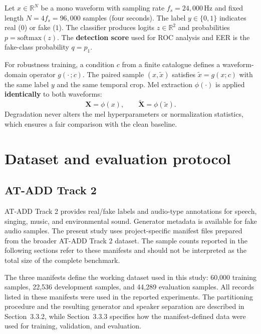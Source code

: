 \documentclass[12pt,a4paper]{report}
\begin{document}
Let $x \in \mathbb{R}^{N}$ be a mono waveform with sampling rate $f_s = 24{,}000$\,Hz and fixed length $N = 4 f_s = 96{,}000$ samples (four seconds). The label $y \in \{0,1\}$ indicates real ($0$) or fake ($1$). The classifier produces logits $z \in \mathbb{R}^2$ and probabilities $p = \mathrm{softmax}(z)$. The \textbf{detection score} used for ROC analysis and EER is the fake-class probability $q = p_1$.

For robustness training, a condition $c$ from a finite catalogue defines a waveform-domain operator $g(\cdot\,; c)$. The paired sample $(x, \tilde{x})$ satisfies $\tilde{x} = g(x; c)$ with the same label $y$ and the same temporal crop. Mel extraction $\phi(\cdot)$ is applied \textbf{identically} to both waveforms:
\begin{equation}
\mathbf{X} = \phi(x), \qquad \tilde{\mathbf{X}} = \phi(\tilde{x}).
\label{eq:pair}
\end{equation}
Degradation never alters the mel hyperparameters or normalization statistics, which ensures a fair comparison with the clean baseline.

\section{Dataset and evaluation protocol}
\label{sec:data}

\subsection{AT-ADD Track 2}
\label{sec:data-track2}

AT-ADD Track 2 provides real/fake labels and audio-type annotations for speech, singing, music, and environmental sound. Generator metadata is available for fake audio samples. The present study uses project-specific manifest files prepared from the broader AT-ADD Track 2 dataset. The sample counts reported in the following sections refer to these manifests and should not be interpreted as the total size of the complete benchmark.

The three manifests define the working dataset used in this study: 60,000 training samples, 22,536 development samples, and 44,289 evaluation samples. All records listed in these manifests were used in the reported experiments. The partitioning procedure and the resulting generator and speaker separation are described in Section~3.3.2, while Section~3.3.3 specifies how the manifest-defined data were used for training, validation, and evaluation.
\end{document}
